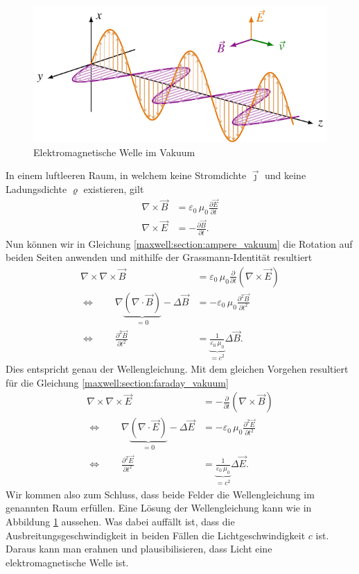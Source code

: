 \begin{figure}
	\centering
	\includegraphics{papers/maxwell/images/emwelle.pdf}
	\caption{Elektromagnetische Welle im Vakuum}
	\label{maxwell:section:bild_em_welle}
\end{figure}
In einem luftleeren Raum, in welchem keine Stromdichte $\vec{\jmath}$ und keine Ladungsdichte $\varrho$ existieren, gilt
\begin{align}
\nabla \times \vec{B}
&=
\varepsilon_0\,\mu_0 \frac{\partial \vec{E}}{\partial t}
\label{maxwell:section:ampere_vakuum}
\\
\nabla \times \vec{E}
&=
-\frac{\partial \vec{B}}{\partial t}.
\label{maxwell:section:faraday_vakuum}
\end{align}
Nun können wir in Gleichung \eqref{maxwell:section:ampere_vakuum} die Rotation auf beiden Seiten anwenden und mithilfe der Grassmann-Identität resultiert
\begin{align*}
\nabla \times \nabla \times \vec{B}
&=
\varepsilon_0\,\mu_0 \frac{\partial}{\partial t} (\nabla \times \vec{E})\\
\Leftrightarrow \qquad \nabla \underbrace{(\nabla \cdot \vec{B})}_{\displaystyle=0} - \Delta \vec{B}
&=
-\varepsilon_0\,\mu_0 \frac{\partial ^2 \vec{B}}{\partial t^2}\\
\Leftrightarrow \qquad \frac{\partial ^2 \vec{B}}{\partial t^2}
&=
\underbrace{\frac{1}{\varepsilon_0\,\mu_0}}_{\displaystyle=c^2} \Delta \vec{B}.
\end{align*}
Dies entspricht genau der Wellengleichung.
Mit dem gleichen Vorgehen resultiert für die Gleichung \eqref{maxwell:section:faraday_vakuum}
\begin{align*}
\nabla \times \nabla \times \vec{E}
&=
- \frac{\partial}{\partial t} (\nabla \times \vec{B})\\
\Leftrightarrow \qquad \nabla \underbrace{(\nabla \cdot \vec{E})}_{\displaystyle=0} - \Delta \vec{E}
&=
- \varepsilon_0\,\mu_0 \frac{\partial ^2 \vec{E}}{\partial t^2}\\
\Leftrightarrow \qquad \frac{\partial ^2 \vec{E}}{\partial t^2}
&=
\underbrace{\frac{1}{\varepsilon_0\,\mu_0}}_{\displaystyle=c^2} \Delta \vec{E}.
\end{align*}
Wir kommen also zum Schluss, dass beide Felder die Wellengleichung im genannten Raum erfüllen. Eine Lösung der Wellengleichung kann wie in Abbildung \ref{maxwell:section:bild_em_welle} aussehen. Was dabei auffällt ist, dass die Ausbreitungsgeschwindigkeit in beiden Fällen die Lichtgeschwindigkeit $c$ ist. 
Daraus kann man erahnen und plausibilisieren, dass Licht eine elektromagnetische Welle ist. 


